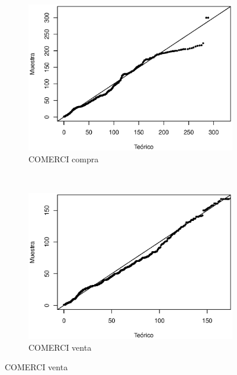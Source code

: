 \documentclass[11pt]{article}
\numberwithin{equation}{section} %
\begin{document}
\begin{figure}[htbp]
\begin{subfigure}[b]{0.5\textwidth}
\centering
\includegraphics[width=\textwidth, trim=0 0.5cm 0 1cm]{comercicompraqq.eps}
\caption{COMERCI compra}
\label{fig:comercicompraqq}
\end{subfigure}%
~ %
\begin{subfigure}[b]{0.5\textwidth}
\centering
\includegraphics[width=\textwidth, trim=0 0.5cm 0 1cm]{comerciventaqq.eps}
\caption{COMERCI venta}
\label{fig:comerciventaqq}
\end{subfigure}


\end{figure}
\end{document}
